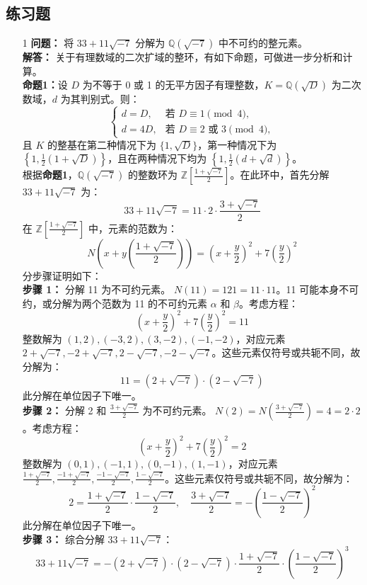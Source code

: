 \documentclass[UTF8]{ctexart}
\begin{document}
\subsection{练习题}

\begin{enumerate}

\begin{enumerate}

\item[1] 
\textbf{问题：} 将 \(33 + 11 \sqrt{-7}\) 分解为 \(\mathbb{Q}(\sqrt{-7})\) 中不可约的整元素。\\
\textbf{解答：} 关于有理数域的二次扩域的整环，有如下命题，可做进一步分析和计算。\\
\textbf{命题1：}设 \(D\) 为不等于 0 或 1 的无平方因子有理整数，\(K = \mathbb{Q}(\sqrt{D})\) 为二次数域，\(d\) 为其判别式。则：
\[
\begin{cases}
d = D, & \text{若 } D \equiv 1 \pmod{4}, \\
d = 4D, & \text{若 } D \equiv 2 \text{ 或 } 3 \pmod{4},
\end{cases}
\]
且 \(K\) 的整基在第二种情况下为 \(\{1, \sqrt{D}\}\)，第一种情况下为 \(\left\{1, \frac{1}{2}(1 + \sqrt{D})\right\}\)，且在两种情况下均为 \(\left\{1, \frac{1}{2}(d + \sqrt{d})\right\}\)。\\

根据\textbf{命题1}，\(\mathbb{Q}(\sqrt{-7})\) 的整数环为 \(\mathbb{Z}\left[\frac{1 + \sqrt{-7}}{2}\right]\)。在此环中，首先分解 \(33 + 11 \sqrt{-7}\) 为：
\[
33 + 11 \sqrt{-7} = 11 \cdot 2 \cdot \frac{3 + \sqrt{-7}}{2}
\]
在 \(\mathbb{Z}\left[\frac{1 + \sqrt{-7}}{2}\right]\) 中，元素的范数为：
\[
N\left(x + y \left(\frac{1 + \sqrt{-7}}{2}\right)\right) = \left(x + \frac{y}{2}\right)^2 + 7 \left(\frac{y}{2}\right)^2
\]
分步骤证明如下：\\
\textbf{步骤 1：} 分解 11 为不可约元素。  
\(N(11) = 121 = 11 \cdot 11\)。11 可能本身不可约，或分解为两个范数为 11 的不可约元素 \(\alpha\) 和 \(\beta\)。考虑方程：
\[
\left(x + \frac{y}{2}\right)^2 + 7 \left(\frac{y}{2}\right)^2 = 11
\]
整数解为 \((1, 2), (-3, 2), (3, -2), (-1, -2)\)，对应元素 \(2 + \sqrt{-7}, -2 + \sqrt{-7}, 2 - \sqrt{-7}, -2 - \sqrt{-7}\)。这些元素仅符号或共轭不同，故分解为：
\[
11 = (2 + \sqrt{-7}) \cdot (2 - \sqrt{-7})
\]
此分解在单位因子下唯一。\\
\textbf{步骤 2：} 分解 2 和 \(\frac{3 + \sqrt{-7}}{2}\) 为不可约元素。  
\(N(2) = N\left(\frac{3 + \sqrt{-7}}{2}\right) = 4 = 2 \cdot 2\)。考虑方程：
\[
\left(x + \frac{y}{2}\right)^2 + 7 \left(\frac{y}{2}\right)^2 = 2
\]
整数解为 \((0, 1), (-1, 1), (0, -1), (1, -1)\)，对应元素 \(\frac{1 + \sqrt{-7}}{2}, \frac{-1 + \sqrt{-7}}{2}, \frac{-1 - \sqrt{-7}}{2}, \frac{1 - \sqrt{-7}}{2}\)。这些元素仅符号或共轭不同，故分解为：
\[
2 = \frac{1 + \sqrt{-7}}{2} \cdot \frac{1 - \sqrt{-7}}{2}, \quad \frac{3 + \sqrt{-7}}{2} = -\left(\frac{1 - \sqrt{-7}}{2}\right)^2
\]
此分解在单位因子下唯一。\\
\textbf{步骤 3：} 综合分解 \(33 + 11 \sqrt{-7}\)：
\[
33 + 11 \sqrt{-7} = -(2 + \sqrt{-7}) \cdot (2 - \sqrt{-7}) \cdot \frac{1 + \sqrt{-7}}{2} \cdot \left(\frac{1 - \sqrt{-7}}{2}\right)^3
\]


\end{enumerate}
\end{enumerate}
\end{document}
